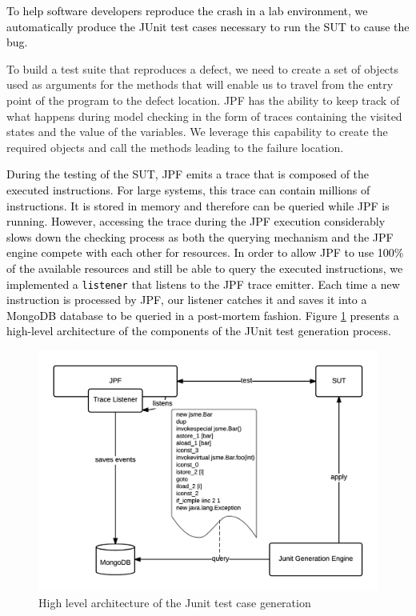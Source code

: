 \documentclass[times, doublespace]{smrauth}
\newcommand{\red}[1]{\textcolor{black}{#1}}
\begin{document}
{\red{To help software developers reproduce the crash in a lab
environment, we automatically produce the JUnit test cases
necessary to run the SUT to cause the bug.}

To build a test suite that reproduces a defect, we need to create
a set of objects used as arguments for the methods that will
enable us to travel from the entry point of the program to the
defect location. JPF has the ability to keep track of what
happens during model checking in the form of traces
containing the visited states and the value of the variables. We
leverage this capability to create the required objects and call
the methods leading to the failure location.

\red{During the testing of the SUT, JPF emits a trace that is composed of the executed instructions.
For large systems, this trace can contain millions of instructions. It is stored in memory and therefore can be queried while JPF is running.
However, accessing the trace during the JPF execution considerably slows down the checking process as both the querying mechanism and the JPF engine compete with each other for resources.
In order to allow JPF to use 100\% of the available resources and still be able to query the executed instructions, we implemented a {\tt listener} that listens to the JPF trace emitter.
Each time a new instruction is processed by JPF, our listener catches it and saves it into a MongoDB database to be queried in a post-mortem fashion. Figure \ref{fig:jcharming-unittest} presents a high-level architecture of the components of the JUnit test generation process.}

\begin{figure}
  \centering
    \includegraphics[scale=0.8]{media/unittest.png}
    \caption{High level architecture of the Junit test case generation
    \label{fig:jcharming-unittest}}
\end{figure}


}
\end{document}
